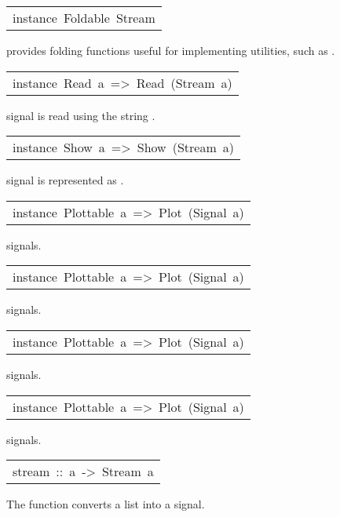 \begin{haddockdesc}
\item[\begin{tabular}{@{}l}
instance\ Foldable\ Stream
\end{tabular}]\haddockbegindoc
provides folding functions useful for implementing utilities, such as .\par


\item[\begin{tabular}{@{}l}
instance\ Read\ a\ =>\ Read\ (Stream\ a)
\end{tabular}]\haddockbegindoc
signal  is read using the string .\par


\item[\begin{tabular}{@{}l}
instance\ Show\ a\ =>\ Show\ (Stream\ a)
\end{tabular}]\haddockbegindoc
signal  is represented as .\par


\item[\begin{tabular}{@{}l}
instance\ Plottable\ a\ =>\ Plot\ (Signal\ a)
\end{tabular}]\haddockbegindoc
{} signals.\par


\item[\begin{tabular}{@{}l}
instance\ Plottable\ a\ =>\ Plot\ (Signal\ a)
\end{tabular}]\haddockbegindoc
{} signals.\par


\item[\begin{tabular}{@{}l}
instance\ Plottable\ a\ =>\ Plot\ (Signal\ a)
\end{tabular}]\haddockbegindoc
{} signals.\par


\item[\begin{tabular}{@{}l}
instance\ Plottable\ a\ =>\ Plot\ (Signal\ a)
\end{tabular}]\haddockbegindoc
{} signals.\par


\item[\begin{tabular}{@{}l}
stream\ ::\ {\char 91}a{\char 93}\ ->\ Stream\ a
\end{tabular}]\haddockbegindoc
The function  converts a list into a signal.\par



\end{haddockdesc}
